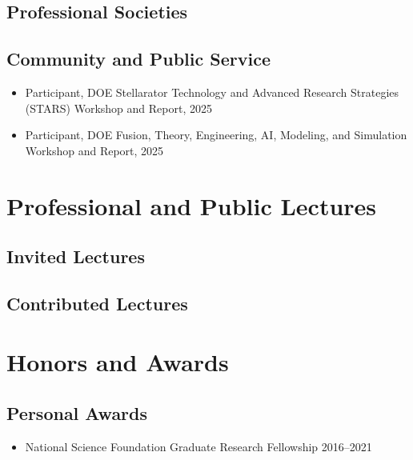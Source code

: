 \documentclass[11 pt]{rpibio}
\begin{document}
\subsection{Professional Societies}



\subsection{Community and Public Service}
\begin{itemize}
\item Participant, DOE Stellarator Technology and Advanced Research Strategies (STARS) Workshop and Report, 2025
\item Participant, DOE Fusion, Theory, Engineering, AI, Modeling, and Simulation Workshop and Report, 2025
\end{itemize}


\section{Professional and Public Lectures}
\contributionstable

\subsection{Invited Lectures}
\begin{refcontext}[labelprefix=IL]
  \printbibliography[filter=invited_lectures, heading=none,resetnumbers=true]
\end{refcontext} 

\subsection{Contributed Lectures}
\begin{refcontext}[labelprefix=CL]
  \printbibliography[filter=contributed_lectures, heading=none,resetnumbers=true]
\end{refcontext} 

\section{Honors and Awards}
\subsection{Personal Awards}
\begin{itemize}
  \item National Science Foundation Graduate Research Fellowship \hfill 2016--2021
\end{itemize}
\end{document}
